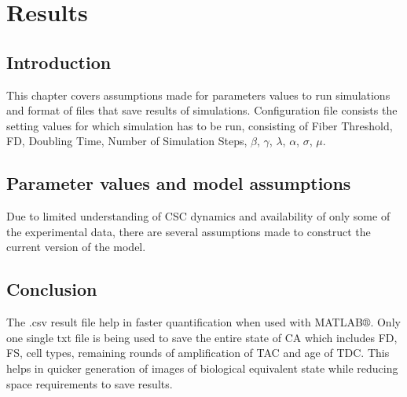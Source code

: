 \chapter*{Results}

\section*{Introduction}
This chapter covers assumptions made for parameters values to run simulations and format of files that save results of simulations.
Configuration file consists the setting values for which simulation has to be run, consisting of Fiber Threshold, FD, Doubling Time, 
Number of Simulation Steps, $\beta$, $\gamma$, $\lambda$, $\alpha$, $\sigma$, $\mu$.


\section*{Parameter values and model assumptions}
Due to limited understanding of CSC dynamics and availability of only some of the experimental data, 
there are several assumptions made to construct the current version of the model. 

\section*{Conclusion}  
The .csv result file help in faster quantification when used with MATLAB$\circledR$. 
Only one single txt file is being used to save the entire state of CA which includes  FD, FS, cell types, remaining rounds of amplification of TAC and age of TDC.
This helps in quicker generation of images of biological equivalent state while reducing space requirements to save results.

